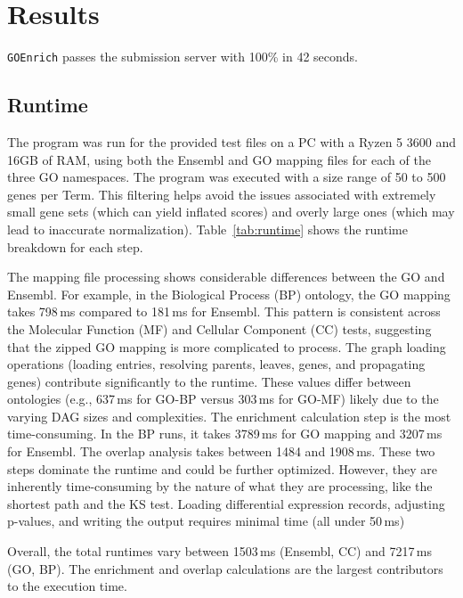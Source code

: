 \documentclass{article}
\begin{document}
    \section{Results}\label{sec:results}
    \texttt{GOEnrich} passes the submission server with 100\% in 42 seconds.

    \subsection{Runtime}\label{subsec:runtime}

    The program was run for the provided test files on a PC with a Ryzen 5 3600 and 16GB of RAM, using both the Ensembl and GO mapping files for each of the three GO namespaces. The program was executed with a size range of 50 to 500 genes per Term. This filtering helps avoid the issues associated with extremely small gene sets (which can yield inflated scores) and overly large ones (which may lead to inaccurate normalization)\cite{gsea_user_guide}. Table~\ref{tab:runtime} shows the runtime breakdown for each step.


    The mapping file processing shows considerable differences between the GO and Ensembl. For example, in the Biological Process (BP) ontology, the GO mapping takes 798\,ms compared to 181\,ms for Ensembl. This pattern is consistent across the Molecular Function (MF) and Cellular Component (CC) tests, suggesting that the zipped GO mapping is more complicated to process. The graph loading operations (loading entries, resolving parents, leaves, genes, and propagating genes) contribute significantly to the runtime. These values differ between ontologies (e.g., 637\,ms for GO-BP versus 303\,ms for GO-MF) likely due to the varying DAG sizes and complexities. The enrichment calculation step is the most time-consuming. In the BP runs, it takes 3789\,ms for GO mapping and 3207\,ms for Ensembl. The overlap analysis takes between 1484 and 1908\,ms. These two steps dominate the runtime and could be further optimized. However, they are inherently time-consuming by the nature of what they are processing, like the shortest path and the KS test. Loading differential expression records, adjusting p-values, and writing the output requires minimal time (all under 50\,ms)

    Overall, the total runtimes vary between 1503\,ms (Ensembl, CC) and 7217\,ms (GO, BP). The enrichment and overlap calculations are the largest contributors to the execution time.
\end{document}
